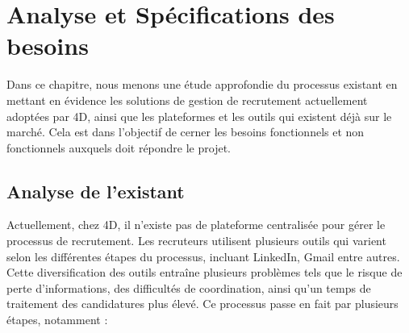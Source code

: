 

\chapter{Analyse et Spécifications des besoins}
\pagestyle{chapterstyle}
Dans ce chapitre, nous menons une étude approfondie du processus existant en mettant
en évidence les solutions de gestion de recrutement actuellement adoptées par 4D, ainsi
que les plateformes et les outils qui existent déjà sur le marché. Cela est dans l’objectif
de cerner les besoins fonctionnels et non fonctionnels auxquels doit répondre le projet.

\newpage
\vspace{1cm}


\section{Analyse de l'existant}
Actuellement, chez 4D, il n’existe pas de plateforme centralisée pour gérer le processus
de recrutement. Les recruteurs utilisent plusieurs outils qui varient selon les différentes
étapes du processus, incluant LinkedIn, Gmail entre autres. Cette diversification des outils
entraîne plusieurs problèmes tels que le risque de perte d’informations, des difficultés de
coordination, ainsi qu’un temps de traitement des candidatures plus élevé. Ce processus
passe en fait par plusieurs étapes, notamment :

